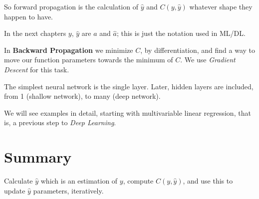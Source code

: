 So forward propagation is the calculation of $\hat{y}$ and $C(y,\hat{y})$ whatever shape they happen to have. 

In the next chapters $y$, $\hat{y}$ are $a$ and $\hat{a}$; this is just the notation used in ML/DL.

In \textbf{Backward Propagation} we minimize $C$, by differentiation, and find a way to move our function parameters towards the minimum of $C$. We use \textit{Gradient Descent} for this task.

The simplest neural network is the single layer. Later, hidden layers are included, from 1 (shallow network), to many (deep network).

We will see examples in detail, starting with multivariable linear regression, that is, a previous step to \textit{Deep Learning}.

\section{Summary}
Calculate $\hat{y}$ which is an estimation of $y$, compute $C(y,\hat{y})$, and use this to update $\hat{y}$ parameters, iteratively.


